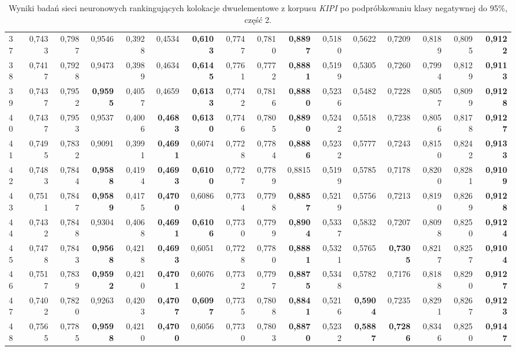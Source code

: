 \begin{table}[htp!]
\begin{adjustwidth}{-2cm}{}
\begin{tabular}{ l | *{15}{| r}}
37	&	0,7433	&	0,7987	&	0,9546	&	0,3928	&	0,4534	&	\textbf{0,6103}	&	0,7747	&	0,7810	&	\textbf{0,8897}	&	0,5180	&	0,5622	&	0,7209	&	0,8189	&	0,8095	&	\textbf{0,9122}	\\
38	&	0,7417	&	0,7928	&	0,9473	&	0,3989	&	0,4634	&	\textbf{0,6145}	&	0,7761	&	0,7772	&	\textbf{0,8881}	&	0,5199	&	0,5305	&	0,7260	&	0,7994	&	0,8129	&	\textbf{0,9113}	\\
39	&	0,7437	&	0,7952	&	\textbf{0,9595}	&	0,4057	&	0,4659	&	\textbf{0,6133}	&	0,7742	&	0,7816	&	\textbf{0,8880}	&	0,5236	&	0,5482	&	0,7228	&	0,8057	&	0,8099	&	\textbf{0,9128}	\\
40	&	0,7437	&	0,7953	&	0,9537	&	0,4006	&	\textbf{0,4683}	&	\textbf{0,6130}	&	0,7746	&	0,7805	&	\textbf{0,8890}	&	0,5242	&	0,5518	&	0,7238	&	0,8056	&	0,8178	&	\textbf{0,9127}	\\
41	&	0,7495	&	0,7832	&	0,9091	&	0,3991	&	\textbf{0,4691}	&	0,6074	&	0,7728	&	0,7784	&	\textbf{0,8886}	&	0,5232	&	0,5777	&	0,7243	&	0,8150	&	0,8242	&	\textbf{0,9133}	\\
42	&	0,7483	&	0,7844	&	\textbf{0,9588}	&	0,4194	&	\textbf{0,4693}	&	\textbf{0,6100}	&	0,7727	&	0,7789	&	0,8815	&	0,5199	&	0,5785	&	0,7178	&	0,8200	&	0,8281	&	\textbf{0,9109}	\\
43	&	0,7511	&	0,7847	&	\textbf{0,9589}	&	0,4175	&	\textbf{0,4700}	&	0,6086	&	0,7734	&	0,7798	&	\textbf{0,8857}	&	0,5219	&	0,5756	&	0,7213	&	0,8190	&	0,8269	&	\textbf{0,9128}	\\
44	&	0,7432	&	0,7848	&	0,9304	&	0,4068	&	\textbf{0,4691}	&	\textbf{0,6106}	&	0,7730	&	0,7799	&	\textbf{0,8904}	&	0,5337	&	0,5832	&	0,7207	&	0,8098	&	0,8250	&	\textbf{0,9124}	\\
45	&	0,7478	&	0,7843	&	\textbf{0,9568}	&	0,4218	&	\textbf{0,4693}	&	0,6051	&	0,7728	&	0,7780	&	\textbf{0,8881}	&	0,5321	&	0,5765	&	\textbf{0,7305}	&	0,8217	&	0,8257	&	\textbf{0,9104}	\\
46	&	0,7517	&	0,7839	&	\textbf{0,9592}	&	0,4210	&	\textbf{0,4701}	&	0,6076	&	0,7732	&	0,7797	&	\textbf{0,8875}	&	0,5348	&	0,5782	&	0,7176	&	0,8188	&	0,8290	&	\textbf{0,9127}	\\
47	&	0,7402	&	0,7820	&	0,9263	&	0,4203	&	\textbf{0,4707}	&	\textbf{0,6097}	&	0,7735	&	0,7808	&	\textbf{0,8841}	&	0,5216	&	\textbf{0,5904}	&	0,7235	&	0,8291	&	0,8267	&	\textbf{0,9123}	\\
48	&	0,7565	&	0,7785	&	\textbf{0,9598}	&	0,4210	&	\textbf{0,4700}	&	0,6056	&	0,7730	&	0,7803	&	\textbf{0,8870}	&	0,5232	&	\textbf{0,5887}	&	\textbf{0,7286}	&	0,8346	&	0,8250	&	\textbf{0,9147}	\\
	\bottomrule
\end{tabular}
 \end{adjustwidth}
\caption[Wyniki badań sieci neuronowych rankingujących kolokacje dwuelementowe z korpusu \emph{KIPI} po podpróbkowaniu klasy negatywnej do 95\%, część 2]{Wyniki badań sieci neuronowych rankingujących kolokacje dwuelementowe z korpusu \emph{KIPI} po podpróbkowaniu klasy negatywnej do 95\%, część 2.}
\label{KIPI_sub5_nn_part_2}
\end{table}


